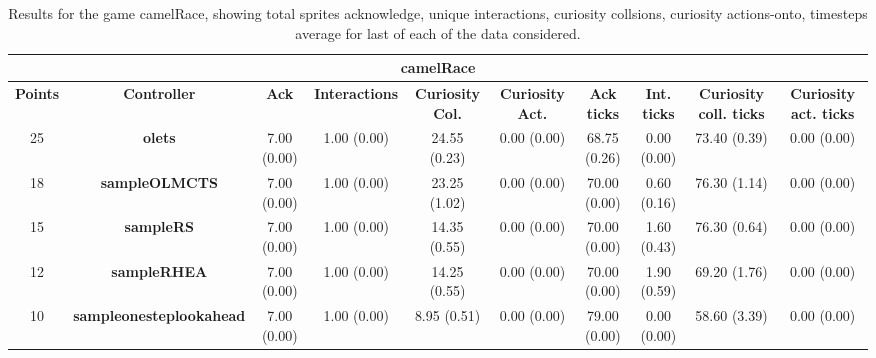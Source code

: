 \begin{table*}[!t]
\begin{center}
\begin{adjustbox}{width=1\textwidth}
\begin{tabular}{|c|c|c|c|c|c|c|c|c|c|}
\multicolumn{10}{c}{\textbf{camelRace}}\\
\hline
\textbf{Points} & \textbf{Controller} & \textbf{Ack} & \textbf{Interactions} & \textbf{Curiosity Col.} & \textbf{Curiosity Act.} & \textbf{Ack ticks} & \textbf{Int. ticks} & \textbf{Curiosity coll. ticks} & \textbf{Curiosity act. ticks}\\
\hline
25 & \textbf{olets} & 7.00 (0.00) & 1.00 (0.00) & 24.55 (0.23) & 0.00 (0.00) & 68.75 (0.26) & 0.00 (0.00) & 73.40 (0.39) & 0.00 (0.00)
 \\
\hline
18 & \textbf{sampleOLMCTS} & 7.00 (0.00) & 1.00 (0.00) & 23.25 (1.02) & 0.00 (0.00) & 70.00 (0.00) & 0.60 (0.16) & 76.30 (1.14) & 0.00 (0.00)
 \\
\hline
15 & \textbf{sampleRS} & 7.00 (0.00) & 1.00 (0.00) & 14.35 (0.55) & 0.00 (0.00) & 70.00 (0.00) & 1.60 (0.43) & 76.30 (0.64) & 0.00 (0.00)
 \\
\hline
12 & \textbf{sampleRHEA} & 7.00 (0.00) & 1.00 (0.00) & 14.25 (0.55) & 0.00 (0.00) & 70.00 (0.00) & 1.90 (0.59) & 69.20 (1.76) & 0.00 (0.00)
 \\
\hline
10 & \textbf{sampleonesteplookahead} & 7.00 (0.00) & 1.00 (0.00) & 8.95 (0.51) & 0.00 (0.00) & 79.00 (0.00) & 0.00 (0.00) & 58.60 (3.39) & 0.00 (0.00)
 \\
\hline
\end{tabular}
\end{adjustbox}
\caption{Results for the game camelRace, showing total sprites acknowledge, unique interactions, curiosity collsions, curiosity actions-onto, timesteps average for last of each of the data considered.}
\label{tab:weights}
\end{center}
\end{table*}
